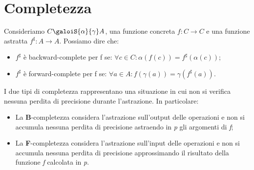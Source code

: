 \documentclass[a4paper, 11pt]{report}
\begin{document}
	\section*{Completezza}
	Consideriamo $C \galoiS{\alpha}{\gamma} A$, una funzione concreta $f: C\rightarrow C$ e una funzione astratta $f^{\sharp}: A\rightarrow A$. Possiamo dire che:
	\begin{itemize}
		\item $f^{\sharp}$ è backward-complete per f se: $\forall c\in C: \alpha(f(c))=f^{\sharp}(\alpha(c))$;
		\item $f^{\sharp}$ è forward-complete per f se: $\forall a\in A: f(\gamma(a))=\gamma(f^{\sharp}(a))$.
	\end{itemize}
	
	I due tipi di completezza rappresentano una situazione in cui non si verifica nessuna perdita di precisione durante l'astrazione. In particolare:
	\begin{itemize}
		\item La \textbf{B}-completezza considera l'astrazione sull'output delle operazioni e non si accumula nessuna perdita di precisione astraendo in \textit{p} gli argomenti di \textit{f};
		\item La \textbf{F}-completezza considera l'astrazione sull'input delle operazioni e non si accumula nessuna perdita di precisione approssimando il risultato della funzione \textit{f} calcolata in \textit{p}.
	\end{itemize}
	
\end{document}
